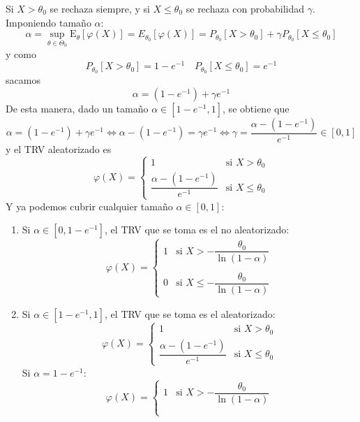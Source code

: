 \documentclass[12pt]{article}
\newcommand{\E}{\mathrm{E}}
\begin{document}
\begin{ejercicio}[2,4 puntos]
\begin{enumerate}
            Si $X > \theta_0$ se rechaza siempre, y si $X \leqslant \theta_0$ se rechaza con probabilidad $\gamma$.
            Imponiendo tamaño $\alpha$:
            $$\alpha = \sup_{\theta \in \Theta_0} \E_\theta[\varphi(X)] = E_{\theta_0}[\varphi(X)]
            = P_{\theta_0}[X >\theta_0] + \gamma P_{\theta_0}[X \leqslant \theta_0]$$
            y como
            $$P_{\theta_0}[X >\theta_0] = 1 - e^{-1} \quad P_{\theta_0}[X \leqslant \theta_0] = e^{-1}$$
            sacamos
            $$\alpha = (1-e^{-1}) + \gamma e^{-1}$$
            De esta manera, dado un tamaño $\alpha \in [1-e^{-1}, 1]$, se obtiene que 
            $$\alpha = (1-e^{-1}) + \gamma e^{-1} \iff \alpha - (1-e^{-1}) = \gamma e^{-1} \iff
            \gamma = \dfrac{\alpha - (1-e^{-1})}{e^{-1}} \in [0,1]$$
            y el TRV aleatorizado es
            $$\varphi(X) = \begin{cases}
                1 &\text{si } X > \theta_0 \\
                \dfrac{\alpha - (1-e^{-1})}{e^{-1}} &\text{si } X \leqslant \theta_0
            \end{cases}$$
            Y ya podemos cubrir cualquier tamaño $\alpha \in [0,1]$:
            \begin{enumerate}
                \item Si $\alpha \in [0, 1 - e^{-1}]$, el TRV que se toma es el no aleatorizado:
                $$
                \varphi(X) = \begin{cases}
                    1 &\text{si } X > - \dfrac{\theta_0}{\ln(1-\alpha)} \\\\
                    0 &\text{si } X \leqslant - \dfrac{\theta_0}{\ln(1-\alpha)}
                \end{cases} 
                $$
                \item Si $\alpha \in [1-e^{-1}, 1]$, el TRV que se toma es el aleatorizado:
                $$\varphi(X) = \begin{cases}
                    1 &\text{si } X > \theta_0 \\
                    \dfrac{\alpha - (1-e^{-1})}{e^{-1}} &\text{si } X \leqslant \theta_0
                \end{cases}$$
                Si $\alpha = 1 - e^{-1}$:
                $$
                \varphi(X) = \begin{cases}
                    1 &\text{si } X > - \dfrac{\theta_0}{\ln(1-\alpha)} \\\\

\end{cases}$$
\end{enumerate}
\end{enumerate}
\end{ejercicio}
\end{document}
